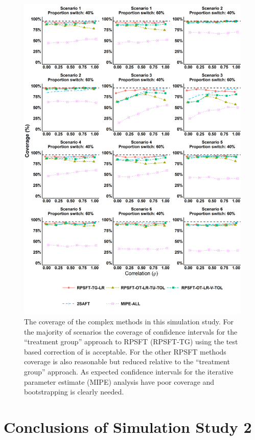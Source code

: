 \begin{figure}[ht]
\centering
\includegraphics[width=13cm]{images/chap_sim3/comp_cov.png}
\caption{\label{F:chap_sim3:comp_cov} The coverage of the complex methods in this simulation study. For the majority of scenarios the coverage of confidence intervals for the ``treatment group'' approach to RPSFT (RPSFT-TG) using the test based correction of \cite{White1999} is acceptable. For the other RPSFT methods coverage is also reasonable but reduced relative to the ``treatment group'' approach. As expected confidence intervals for the iterative parameter estimate (MIPE) analysis have poor coverage and bootstrapping is clearly needed.} 
\end{figure}


\clearpage

\section{Conclusions of Simulation Study 2}

